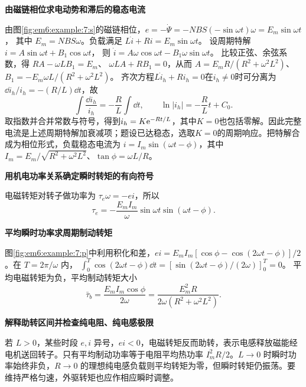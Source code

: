 \begin{solution}\textbf{由磁链相位求电动势和滞后的稳态电流}\par\nobreak
由图\ref{fig:em6:example:7:s}的磁链相位，$e=-\dot\Psi=-NBS(-\sin\omega t)\omega=E_m\sin\omega t$，
其中 $E_m=NBS\omega$。负载满足 $L\dot i+Ri=E_m\sin\omega t$。
设周期特解 $i=A\sin\omega t+B_1\cos\omega t$，
则 $\dot i=A\omega\cos\omega t-B_1\omega\sin\omega t$。
比较正弦、余弦系数，得 $RA-\omega LB_1=E_m$、
$\omega LA+RB_1=0$，从而
$A=E_mR/(R^2+\omega^2L^2)$、
$B_1=-E_m\omega L/(R^2+\omega^2L^2)$。
齐次方程$L\dot i_h+Ri_h=0$在$i_h\ne0$时可分离为$\dd i_h/i_h=-(R/L)\dd t$，故
\[
\int\frac{\dd i_h}{i_h}=-\frac RL\int\dd t,\qquad
\ln|i_h|=-\frac RLt+C_0.
\]
取指数并合并常数与符号，得到$i_h=K\mathrm e^{-Rt/L}$，其中$K=0$也包括零解。因此完整电流是上述周期特解加衰减项；题设已达稳态，选取$K=0$的周期响应。把特解合成为相位形式，负载稳态电流为 $i=I_m\sin(\omega t-\phi)$，其中 $I_m=E_m/\sqrt{R^2+\omega^2L^2}$、$\tan\phi=\omega L/R$。

\par\medskip{}\noindent\textbf{用机电功率关系确定瞬时转矩的有向符号}\par\nobreak
电磁转矩对转子做功率为 $\tau_e\omega=-ei$，所以
\[\tau_e=-\frac{E_mI_m}{\omega}\sin\omega t\sin(\omega t-\phi).\]



\par\medskip{}\noindent\textbf{平均瞬时功率求周期制动转矩}\par\nobreak
图\ref{fig:em6:example:7:p}中利用积化和差，$ei=E_mI_m[\cos\phi-\cos(2\omega t-\phi)]/2$。在 $T=2\pi/\omega$ 内，
$\int_0^T\cos(2\omega t-\phi)\dd t=
[\sin(2\omega t-\phi)/(2\omega)]_0^T=0$。
平均电磁转矩为负，平均制动转矩大小
\[\bar\tau_b=\frac{E_mI_m\cos\phi}{2\omega}=\frac{E_m^2R}{2\omega(R^2+\omega^2L^2)}.\]


\par\medskip{}\noindent\textbf{解释助转区间并检查纯电阻、纯电感极限}\par\nobreak
若 $L>0$，某些时段 $e,i$ 异号，$ei<0$，电磁转矩反而助转，表示电感释放磁能经电机送回转子。只有平均制动功率等于电阻平均热功率 $I_m^2R/2$。$L\to0$ 时瞬时功率始终非负，$R\to0$ 的理想纯电感负载则平均转矩为零，但瞬时转矩仍振荡。要维持严格匀速，外驱转矩也应作相应瞬时调整。\end{solution}
